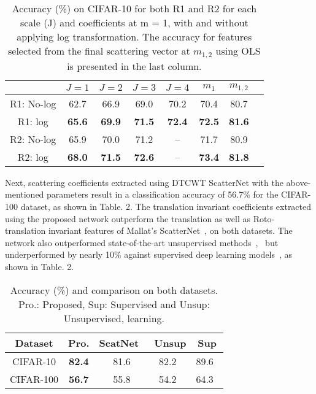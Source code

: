 \documentclass{article}
\begin{document}
\begin{table}[!h]
\centering
\caption{\small{Accuracy (\%) on CIFAR-10 for both R1 and R2 for each scale (J) and coefficients at m = 1, with and without applying log transformation. The accuracy for features selected from the final scattering vector at $m_{1,2}$ using OLS is presented in the last column.}}
\label{components}
\begin{tabular}{c|ccccccc}
\hline
 & \small{$J=1$} & \small{$J=2$} & \small{$J=3$} & \small{$J=4$} & \small{$m_{1}$} & \small{$m_{1,2}$} \\ \hline \hline
 \small{R1: No-log} & 62.7 & 66.9 & 69.0 & 70.2 & 70.4 & 80.7  \\
 \small{R1: log } & \textbf{65.6} & \textbf{69.9} & \textbf{71.5} & \textbf{72.4} & \textbf{72.5}  & \textbf{81.6} \\ \hline
 
  \small{R2: No-log} & 65.9 & 70.0 & 71.2 & -- & 71.7 & 80.9  \\
 \small{R2: log} & \textbf{68.0} & \textbf{71.5} & \textbf{72.6} & -- & \textbf{73.4}  & \textbf{81.8} \\

\end{tabular}
\end{table}
\vspace{-3mm}

Next, scattering coefficients extracted using DTCWT ScatterNet with the above-mentioned parameters result in a classification accuracy of 56.7\% for the CIFAR-100 dataset, as shown in Table. 2. The translation invariant coefficients extracted using the proposed network outperform the translation as well as Roto-translation invariant features of Mallat's ScatterNet~\cite{Oyallon2015}, on both datasets. The network also outperformed state-of-the-art unsupervised methods~\cite{sohn},~\cite{jia} but underperformed by nearly 10\% against supervised deep learning models~\cite{NIN}, as shown in Table. 2. \vspace{-5mm}

\begin{table}[!h]
\centering
\caption{\small{Accuracy (\%) and comparison on both datasets. Pro.: Proposed, Sup: Supervised and Unsup: Unsupervised, learning.}}
\label{MNIST}
\begin{tabular}{c|cccc}
\hline
 Dataset & Pro. & ScatNet~\cite{Oyallon2015} & Unsup & Sup\\
 \hline
 CIFAR-10 & \textbf{82.4} & 81.6 & 82.2~\cite{sohn} & 89.6~\cite{NIN}\\
 CIFAR-100 & \textbf{56.7} & 55.8 & 54.2~\cite{jia} & 64.3~\cite{NIN}\\

\end{tabular}
\end{table}
\vspace{-3mm}
\end{document}
